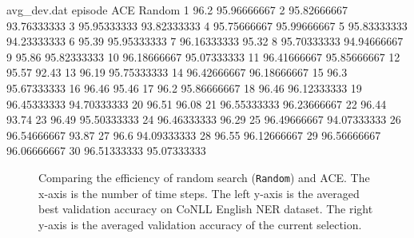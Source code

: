 \documentclass{article} \usepackage{iclr2021_conference,times}
\begin{document}
\begin{filecontents}{avg_dev.dat}
episode	ACE	Random
1	96.2	95.96666667
2	95.82666667	93.76333333
3	95.95333333	93.82333333
4	95.75666667	95.99666667
5	95.83333333	94.23333333
6	95.39	95.95333333
7	96.16333333	95.32
8	95.70333333	94.94666667
9	95.86	95.82333333
10	96.18666667	95.07333333
11	96.41666667	95.85666667
12	95.57	92.43
13	96.19	95.75333333
14	96.42666667	96.18666667
15	96.3	95.67333333
16	96.46	95.46
17	96.2	95.86666667
18	96.46	96.12333333
19	96.45333333	94.70333333
20	96.51	96.08
21	96.55333333	96.23666667
22	96.44	93.74
23	96.49	95.50333333
24	96.46333333	96.29
25	96.49666667	94.07333333
26	96.54666667	93.87
27	96.6	94.09333333
28	96.55	96.12666667
29	96.56666667	96.06666667
30	96.51333333	95.07333333
\end{filecontents}


\begin{figure}[t!]
\begin{minipage}{1.0\linewidth}
\centering
{}
\caption{Comparing the efficiency of random search ({\tt Random}) and ACE. The x-axis is the number of time steps. The left y-axis is the averaged best validation accuracy on CoNLL English NER dataset. The right y-axis is the averaged validation accuracy of the current selection.}
\label{fig:dev_curve}
\end{minipage}
\vspace{-0.4cm}
\end{figure}
\end{document}
